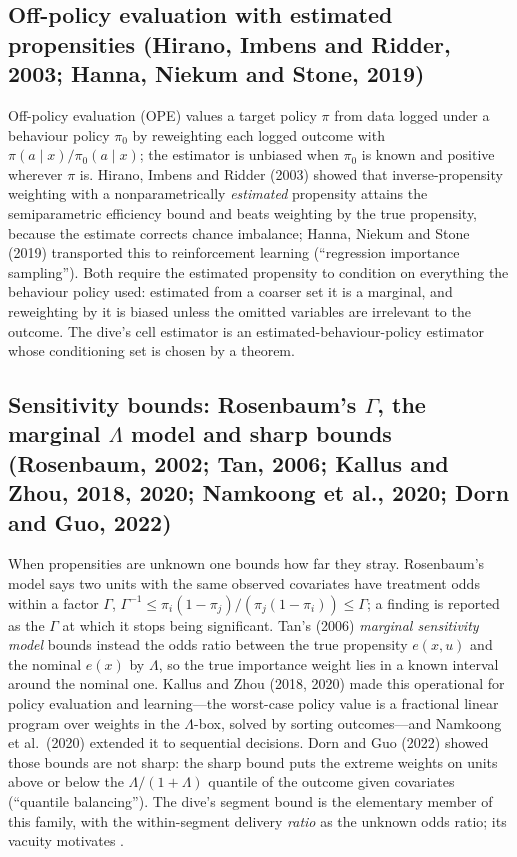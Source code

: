 \subsection{Off-policy evaluation with estimated propensities (Hirano, Imbens and Ridder, 2003; Hanna, Niekum and Stone, 2019)}

Off-policy evaluation (OPE) values a target policy $\pi$ from data logged under a behaviour policy $\pi_0$ by reweighting each logged outcome with $\pi(a \mid x)/\pi_0(a \mid x)$; the estimator is unbiased when $\pi_0$ is known and positive wherever $\pi$ is. Hirano, Imbens and Ridder (2003) showed that inverse-propensity weighting with a nonparametrically \emph{estimated} propensity attains the semiparametric efficiency bound and beats weighting by the true propensity, because the estimate corrects chance imbalance; Hanna, Niekum and Stone (2019) transported this to reinforcement learning (``regression importance sampling''). Both require the estimated propensity to condition on everything the behaviour policy used: estimated from a coarser set it is a marginal, and reweighting by it is biased unless the omitted variables are irrelevant to the outcome. The dive's cell estimator is an estimated-behaviour-policy estimator whose conditioning set is chosen by a theorem.

\subsection{Sensitivity bounds: Rosenbaum's $\Gamma$, the marginal $\Lambda$ model and sharp bounds (Rosenbaum, 2002; Tan, 2006; Kallus and Zhou, 2018, 2020; Namkoong et al., 2020; Dorn and Guo, 2022)}

When propensities are unknown one bounds how far they stray. Rosenbaum's model says two units with the same observed covariates have treatment odds within a factor $\Gamma$, $\Gamma^{-1} \le \pi_i(1-\pi_j)/(\pi_j(1-\pi_i)) \le \Gamma$; a finding is reported as the $\Gamma$ at which it stops being significant. Tan's (2006) \emph{marginal sensitivity model} bounds instead the odds ratio between the true propensity $e(x,u)$ and the nominal $e(x)$ by $\Lambda$, so the true importance weight lies in a known interval around the nominal one. Kallus and Zhou (2018, 2020) made this operational for policy evaluation and learning---the worst-case policy value is a fractional linear program over weights in the $\Lambda$-box, solved by sorting outcomes---and Namkoong et al.\ (2020) extended it to sequential decisions. Dorn and Guo (2022) showed those bounds are not sharp: the sharp bound puts the extreme weights on units above or below the $\Lambda/(1+\Lambda)$ quantile of the outcome given covariates (``quantile balancing''). The dive's segment bound is the elementary member of this family, with the within-segment delivery \emph{ratio} as the unknown odds ratio; its vacuity motivates .

